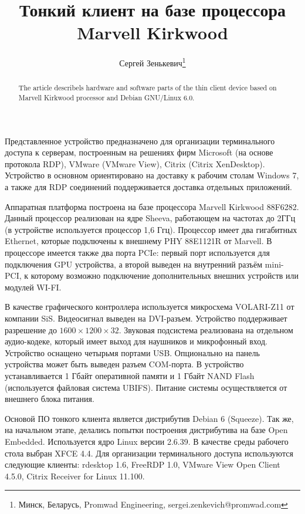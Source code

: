 \documentclass[10pt, a5paper]{article}
\begin{document}
\title{Тонкий клиент на базе процессора Marvell Kirkwood}%

\author{Сергей Зенькевич\footnote{Минск, Беларусь, Promwad Engineering, sergei.zenkevich@promwad.com}}
\maketitle

\begin{abstract}
The article describels hardware and software parts of the thin client device based on Marvell Kirkwood processor and Debian GNU/Linux 6.0.
\end{abstract}


Представленное устройство предназначено для организации терминального доступа к серверам, построенным на решениях фирм Microsoft (на основе протокола RDP), VMware (VMware View), Citrix (Citrix XenDesktop). Устройство в основном ориентировано на доставку к рабочим столам Windows 7, а также для RDP соединений поддерживается доставка отдельных приложений.

Аппаратная платформа построена на базе процессора Marvell Kirkwood 88F6282. Данный процессор реализован на ядре Sheeva, работающем на частотах до 2ГГц (в устройстве используется процессор 1,6 Ггц). Процессор имеет два гигабитных Ethernet, которые подключены к внешнему PHY 88E1121R от Marvell. В процессоре имеется также два порта PCIe: первый порт используется для подключения GPU устройства, а второй выведен на внутренний разъём mini-PCI, к которому возможно подключение дополнительных внешних устройств или модулей WI-FI.

В качестве графического контроллера используется микросхема VOLARI-Z11 от компании SiS. Видеосигнал выведен на DVI-разъем. Устройство поддерживает разрешение до $1600\times1200\times32$. Звуковая подсистема реализована на отдельном аудио-кодеке, который имеет выход для наушников и микрофонный вход. Устройство оснащено четырьмя портами USB. Опционально на панель устройства может быть выведен разъем COM-порта. В устройство устанавливается 1 Гбайт оперативной памяти и 1 Гбайт NAND Flash (используется файловая система UBIFS). Питание системы осуществляется от внешнего блока питания.

Основой ПО тонкого клиента является дистрибутив Debian 6 (Squeeze). Так же, на начальном этапе, делались попытки построения дистрибутива на базе Open Embedded. Используется ядро Linux версии 2.6.39. В качестве среды рабочего стола выбран XFCE 4.4. Для организации терминального доступа используются следующие клиенты: rdesktop 1.6, FreeRDP 1.0, VMware View Open Client 4.5.0, Citrix Receiver for Linux 11.100.
\end{document}
